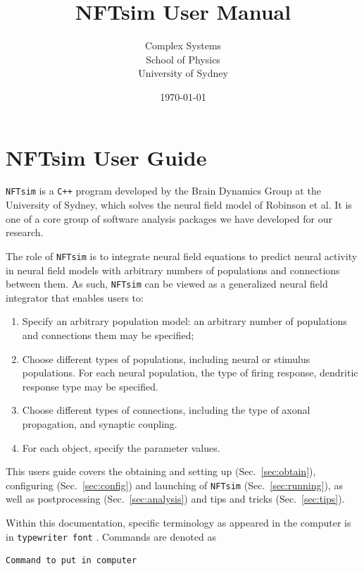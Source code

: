 \documentclass[12pt,a4paper]{article}
\title{NFTsim User Manual}
\author{Complex Systems\\School of Physics\\University of Sydney}
\date{\today}
\newcommand{\type}[1]{{\small\small\tt #1} }
\newcommand{\NF}[0]{\type{NFTsim}}
\newenvironment{worked_example}
{\begin{lrbox}{\mybox}\begin{minipage}{\textwidth}}
{\end{minipage}\end{lrbox}\fcolorbox{black}{skyblue}{\parbox{\textwidth}{{\bf Worked example}\\\\\usebox{\mybox}}}}
\begin{document}
\section*{NFTsim User Guide}

\NF is a \type{C++} program developed by the Brain Dynamics Group at the University of Sydney, which solves the neural field model of Robinson et al. It is one of a core group of software analysis packages we have developed for our research.

The role of \NF is to integrate neural field equations to predict neural activity in neural field models with arbitrary numbers of populations and connections between them. As such, \NF can be viewed as a generalized neural field integrator that enables users to:

\begin{enumerate}
    \item Specify an arbitrary population model: an arbitrary number of populations and connections them may be specified;
    \item Choose different types of populations, including neural or stimulus populations. For each neural population, the type of firing response, dendritic response type may be specified.
    \item Choose different types of connections, including the type of axonal propagation, and synaptic coupling.
    \item For each object, specify the parameter values.
\end{enumerate}

This users guide covers the obtaining and setting up (Sec.~\ref{sec:obtain}), configuring (Sec.~\ref{sec:config}) and launching of \NF (Sec.~\ref{sec:running}), as well as postprocessing (Sec.~\ref{sec:analysis}) and tips and tricks (Sec.~\ref{sec:tips}).

Within this documentation, specific terminology as appeared in the computer is in \type{typewriter font}. Commands are denoted as
\begin{lstlisting}
Command to put in computer
\end{lstlisting}

\end{document}

